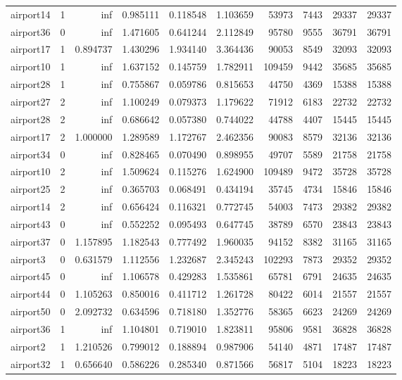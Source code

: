 \begin{longtable}{|l|r|r|r|r|r|r|r|r|r|}
airport14 & 1 & inf & 0.985111 & 0.118548 & 1.103659 & 53973 & 7443 & 29337 & 29337 \\
airport36 & 0 & inf & 1.471605 & 0.641244 & 2.112849 & 95780 & 9555 & 36791 & 36791 \\
airport17 & 1 & 0.894737 & 1.430296 & 1.934140 & 3.364436 & 90053 & 8549 & 32093 & 32093 \\
airport10 & 1 & inf & 1.637152 & 0.145759 & 1.782911 & 109459 & 9442 & 35685 & 35685 \\
airport28 & 1 & inf & 0.755867 & 0.059786 & 0.815653 & 44750 & 4369 & 15388 & 15388 \\
airport27 & 2 & inf & 1.100249 & 0.079373 & 1.179622 & 71912 & 6183 & 22732 & 22732 \\
airport28 & 2 & inf & 0.686642 & 0.057380 & 0.744022 & 44788 & 4407 & 15445 & 15445 \\
airport17 & 2 & 1.000000 & 1.289589 & 1.172767 & 2.462356 & 90083 & 8579 & 32136 & 32136 \\
airport34 & 0 & inf & 0.828465 & 0.070490 & 0.898955 & 49707 & 5589 & 21758 & 21758 \\
airport10 & 2 & inf & 1.509624 & 0.115276 & 1.624900 & 109489 & 9472 & 35728 & 35728 \\
airport25 & 2 & inf & 0.365703 & 0.068491 & 0.434194 & 35745 & 4734 & 15846 & 15846 \\
airport14 & 2 & inf & 0.656424 & 0.116321 & 0.772745 & 54003 & 7473 & 29382 & 29382 \\
airport43 & 0 & inf & 0.552252 & 0.095493 & 0.647745 & 38789 & 6570 & 23843 & 23843 \\
airport37 & 0 & 1.157895 & 1.182543 & 0.777492 & 1.960035 & 94152 & 8382 & 31165 & 31165 \\
airport3 & 0 & 0.631579 & 1.112556 & 1.232687 & 2.345243 & 102293 & 7873 & 29352 & 29352 \\
airport45 & 0 & inf & 1.106578 & 0.429283 & 1.535861 & 65781 & 6791 & 24635 & 24635 \\
airport44 & 0 & 1.105263 & 0.850016 & 0.411712 & 1.261728 & 80422 & 6014 & 21557 & 21557 \\
airport50 & 0 & 2.092732 & 0.634596 & 0.718180 & 1.352776 & 58365 & 6623 & 24269 & 24269 \\
airport36 & 1 & inf & 1.104801 & 0.719010 & 1.823811 & 95806 & 9581 & 36828 & 36828 \\
airport2 & 1 & 1.210526 & 0.799012 & 0.188894 & 0.987906 & 54140 & 4871 & 17487 & 17487 \\
airport32 & 1 & 0.656640 & 0.586226 & 0.285340 & 0.871566 & 56817 & 5104 & 18223 & 18223 \\

\end{longtable}
